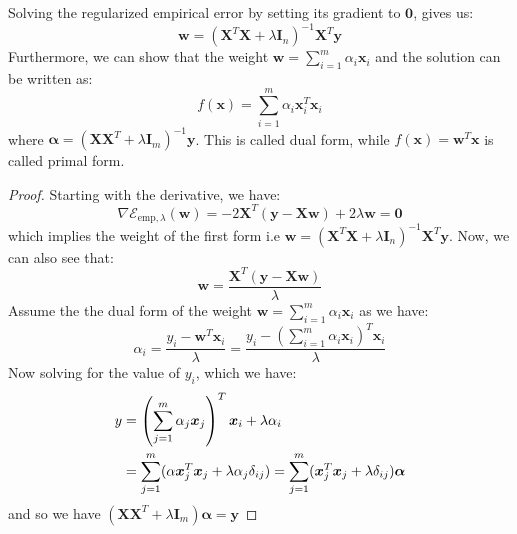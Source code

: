 \begin{proposition}
    Solving the regularized empirical error by setting its gradient to $\boldsymbol 0$, gives us:
    \begin{equation*}
        \boldsymbol w = (\boldsymbol X^T\boldsymbol X + \lambda \boldsymbol I_n)^{-1}\boldsymbol X^T\boldsymbol y
    \end{equation*}
    Furthermore, we can show that the weight $\boldsymbol w = \sum^m_{i=1}\alpha_i\boldsymbol x_i$ and the solution can be written as:
    \begin{equation*}
        f(\boldsymbol x) = \sum^m_{i=1} \alpha_i \boldsymbol x_i^T\boldsymbol x_i
    \end{equation*}
    where $\boldsymbol \alpha = (\boldsymbol X\boldsymbol X^T + \lambda \boldsymbol I_m)^{-1}\boldsymbol y$. This is called dual form, while $f(\boldsymbol x) = \boldsymbol w^T\boldsymbol x$ is called primal form.
\end{proposition}
\begin{proof}
    Starting with the derivative, we have:
    \begin{equation*}
        \nabla \mathcal{E}_{\text{emp}, \lambda} (\boldsymbol w) = -2\boldsymbol X^T(\boldsymbol y - \boldsymbol X\boldsymbol w) + 2\lambda\boldsymbol w = \boldsymbol 0
    \end{equation*}
    which implies the weight of the first form i.e $\boldsymbol w = (\boldsymbol X^T\boldsymbol X + \lambda \boldsymbol I_n)^{-1}\boldsymbol X^T\boldsymbol y$. Now, we can also see that:
    \begin{equation*}
        \boldsymbol w = \frac{\boldsymbol X^T(\boldsymbol y - \boldsymbol X\boldsymbol w)}{\lambda}
    \end{equation*}
    Assume the the dual form of the weight $\boldsymbol w = \sum^m_{i=1}\alpha_i\boldsymbol x_i$ as we have:
    \begin{equation*}
        \alpha_i = \frac{y_i - \boldsymbol w^T\boldsymbol x_i}{\lambda} = \frac{y_i - (\sum^m_{i=1}\alpha_i\boldsymbol x_i)^T\boldsymbol x_i}{\lambda}  
    \end{equation*}
    Now solving for the value of $y_i$, which we have:
    \begin{equation*}
    \begin{aligned}
        y &= \left( \sum^m_{j=1}\alpha_j\boldsymbol x_j \right)^T \boldsymbol x_i + \lambda\alpha_i \\
        &= \sum^m_{j=1}(\alpha \boldsymbol x_j^T\boldsymbol x_j + \lambda \alpha_j\delta_{ij}) =  \sum^m_{j=1}(\boldsymbol x_j^T\boldsymbol x_j + \lambda\delta_{ij}) \boldsymbol \alpha
    \end{aligned}
    \end{equation*}
    and so we have $(\boldsymbol X\boldsymbol X^T + \lambda \boldsymbol I_m)\boldsymbol \alpha = \boldsymbol y$
\end{proof}

